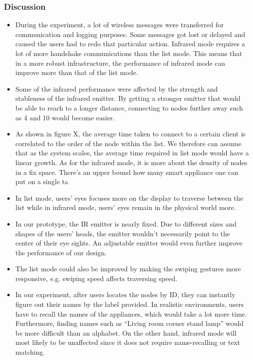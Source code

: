 \subsubsection{Discussion}

\begin{itemize}
\item During the experiment, a lot of wireless messages were transferred for communication and logging purposes. Some messages got lost or delayed and caused the users had to redo that particular action. Infrared mode requires a lot of more handshake communications than the list mode. This means that in a more robust infrastructure, the performance of infrared mode can improve more than that of the list mode.

\item Some of the infrared performance were affected by the strength and stableness of the infrared emitter. By getting a stronger emitter that would be able to reach to a longer distance, connecting to nodes further away such as 4 and 10 would become easier.

\item As shown in figure X, the average time taken to connect to a certain client is correlated to the order of the node within the list. We therefore can assume that as the system scales, the average time required in list mode would have a linear growth. As for the infrared mode, it is more about the density of nodes in a fix space. There’s an upper bound how many smart appliance one can put on a single ta

\item In list mode, users’ eyes focuses more on the display to traverse between the list while in infrared mode, users’ eyes remain in the physical world more.

\item In our prototype, the IR emitter is nearly fixed. Due to different sizes and shapes of the users’ heads, the emitter wouldn’t necessarily point to the center of their eye sights. An adjustable emitter would even further improve the performance of our design.

\item The list mode could also be improved by making the swiping gestures more responsive, e.g. swiping speed affects traversing speed.

\item In our experiment, after users locates the nodes by ID, they can instantly figure out their names by the label provided. In realistic environments, users have to recall the names of the appliances, which would take a lot more time. Furthermore, finding names such as “Living room corner stand lamp” would be more difficult than an alphabet. On the other hand, infrared mode will most likely to be unaffected since it does not require name-recalling or text matching.

 \end{itemize}

